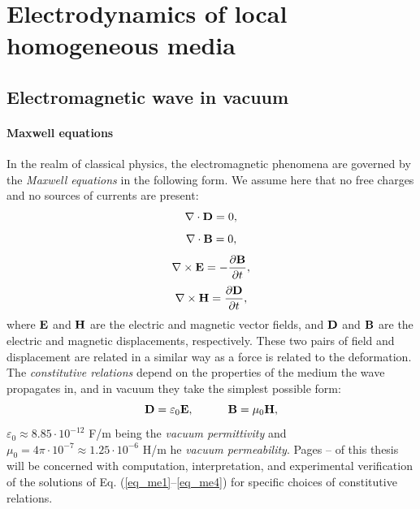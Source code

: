 
\section{Electrodynamics of local homogeneous media} %
\subsection{Electromagnetic wave in vacuum}
\paragraph{Maxwell equations}  %
In the realm of classical physics, the electromagnetic phenomena are governed by the \textit{Maxwell equations} in the following form.
We assume here that no free charges and no sources of currents are present: 
\begin{equation} \nabla \cdot  \mathbf{D} = 0, \label{eq_me1}\end{equation}  
\begin{equation} \nabla \cdot  \mathbf{B} = 0, \label{eq_me2}\end{equation}  
\begin{equation} \nabla \times \mathbf{E} = -\frac{\partial \mathbf{B}} {\partial t}, \label{eq_me3}\end{equation}  
\begin{equation} \nabla \times \mathbf{H} =  \frac{\partial \mathbf{D}} {\partial t}, \label{eq_me4}\end{equation}  
where $\mathbf{E}$ and $\mathbf{H}$ are the electric and magnetic vector fields, and $\mathbf{D}$ and $\mathbf{B}$ are the electric and magnetic displacements,
 respectively. These two pairs of field and displacement are related in a similar way as a force is related to the deformation. %
 The \textit{constitutive relations} depend on the properties of the medium the wave propagates in, and in vacuum they take the simplest possible form:
\begin{equation}		\mathbf{D} = \varepsilon_0	\mathbf{E}, \quad\quad\quad						\mathbf{B} = \mu_0			\mathbf{H},				 \label{eq_ce}\end{equation}
$\varepsilon_0 \approx 8.85\cdot10^{-12}$ F/m being the \textit{vacuum permittivity} and $\mu_0 = 4\pi \cdot 10^{-7} \approx 1.25\cdot10^{-6}$ H/m he \textit{vacuum permeability}. 
Pages \pageref{starttext}--\pageref{endtext} of this thesis will be concerned with computation, interpretation, and experimental verification of the solutions of Eq. (\ref{eq_me1}--\ref{eq_me4})  for specific choices of constitutive relations.

